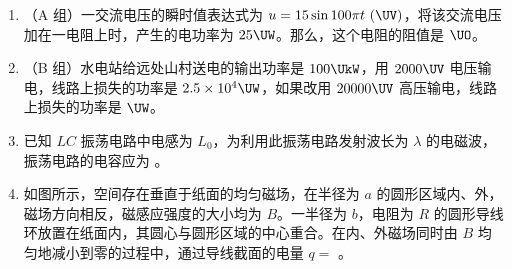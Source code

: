 \documentclass[\gkver]{gaokaozhenti}
\begin{document}
\begin{enumerate}
\item
（A 组）一交流电压的瞬时值表达式为 $u = 15\sin 100\pi t\ (\UV)$，将该交流电压加在一电阻上时，产生的电功率为 $25\UW$。那么，这个电阻的阻值是  $\UO$。

\jdanswer{
$4.5\UO$
}

\item
（B 组）水电站给远处山村送电的输出功率是 $100\UkW$，用 $2000\UV$ 电压输电，线路上损失的功率是 $2.5\times10^{4}\UW$，如果改用 $20000\UV$ 高压输电，线路上损失的功率是  $\UW$。

\jdanswer{
$250\UW$
}

\item
已知 $LC$ 振荡电路中电感为 $L_{0}$，为利用此振荡电路发射波长为 $\lambda$ 的电磁波，振荡电路的电容应为 。


\item
如图所示，空间存在垂直于纸面的均匀磁场，在半径为 $a$ 的圆形区域内、外，磁场方向相反，磁感应强度的大小均为 $B$。一半径为 $b$，电阻为 $R$ 的圆形导线环放置在纸面内，其圆心与圆形区域的中心重合。在内、外磁场同时由 $B$ 均匀地减小到零的过程中，通过导线截面的电量 $q =$ 。
\onepicture[align=right, h=4.76cm]{}



\end{enumerate}
\end{document}

